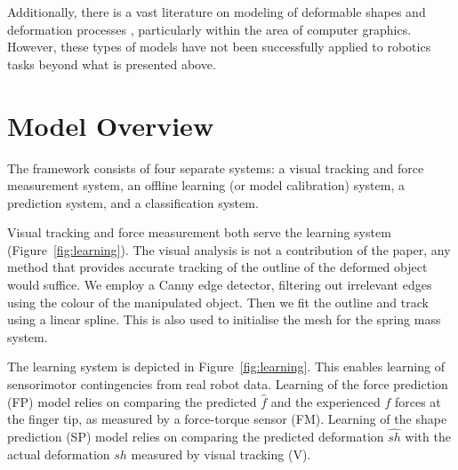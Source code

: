 \documentclass[journal]{IEEEtran}
\newcommand{\comment}[1]{{\color{red} #1}}
\begin{document}
Additionally, there is a vast literature on modeling of deformable shapes and deformation processes \cite{Gibson1997, McInerney1996, Montagnat2001, Moore2007review, Nealen2006review}, particularly within the area of computer graphics.  However, these types of models have not been successfully applied to robotics tasks beyond what is presented above.


\section{Model Overview}
\label{sec:model_overview}

\comment{The framework consists of four separate systems: a visual tracking and force measurement system, an offline learning (or model calibration) system, a prediction system, and a classification system. 

Visual tracking and force measurement both serve the learning system (Figure~\ref{fig:learning}). The visual analysis is not a contribution of the paper, any method that provides accurate tracking of the outline of the deformed object would suffice. We employ a Canny edge detector, filtering out irrelevant edges using the colour of the manipulated object. Then we fit the outline and track using a linear spline. This is also used to initialise the mesh for the spring mass system.}

The learning system is depicted in Figure~\ref{fig:learning}. This enables learning of sensorimotor contingencies from real robot data. Learning of the force prediction (FP) model relies on comparing the predicted $\hat{f}$ and the experienced $f$ forces at the finger tip, as measured by a force-torque sensor (FM). Learning of the shape prediction (SP) model relies on comparing the predicted deformation $\hat{sh}$ with the actual deformation $sh$ measured by visual tracking (V).
\end{document}
